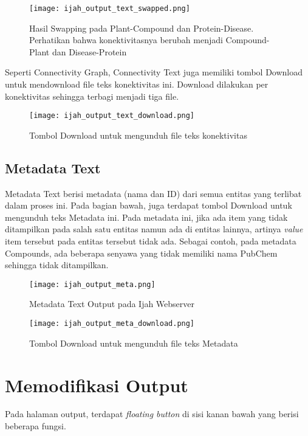 	\begin{figure}[H]
	\centering
	\texttt{[image: ijah\_output\_text\_swapped.png]}
	\caption{Hasil Swapping pada Plant-Compound dan Protein-Disease. Perhatikan bahwa konektivitasnya berubah menjadi Compound-Plant dan Disease-Protein}
	\label{fig:ijah_output_text_swapped}
	\end{figure}

	Seperti Connectivity Graph, Connectivity Text juga memiliki tombol Download untuk mendownload file teks konektivitas ini. Download dilakukan per konektivitas sehingga terbagi menjadi tiga file.

	\begin{figure}[H]
	\centering
	\texttt{[image: ijah\_output\_text\_download.png]}
	\caption{Tombol Download untuk mengunduh file teks konektivitas}
	\label{fig:ijah_output_text_download}
	\end{figure}

	\subsection{Metadata Text} \label{meta}
	Metadata Text berisi metadata (nama dan ID) dari semua entitas yang terlibat dalam proses ini. Pada bagian bawah, juga terdapat tombol Download untuk mengunduh teks Metadata ini. Pada metadata ini, jika ada item yang tidak ditampilkan pada salah satu entitas namun ada di entitas lainnya, artinya \emph{value} item tersebut pada entitas tersebut tidak ada. Sebagai contoh, pada metadata Compounds, ada beberapa senyawa yang tidak memiliki nama PubChem sehingga tidak ditampilkan.

	\begin{figure}[H]
	\centering
	\texttt{[image: ijah\_output\_meta.png]}
	\caption{Metadata Text Output pada Ijah Webserver}
	\label{fig:ijah_output_meta}
	\end{figure}

	\begin{figure}[H]
	\centering
	\texttt{[image: ijah\_output\_meta\_download.png]}
	\caption{Tombol Download untuk mengunduh file teks Metadata}
	\label{fig:ijah_output_meta_download}
	\end{figure}


\section{Memodifikasi Output}
Pada halaman output, terdapat \emph{floating button} di sisi kanan bawah yang berisi beberapa fungsi.

